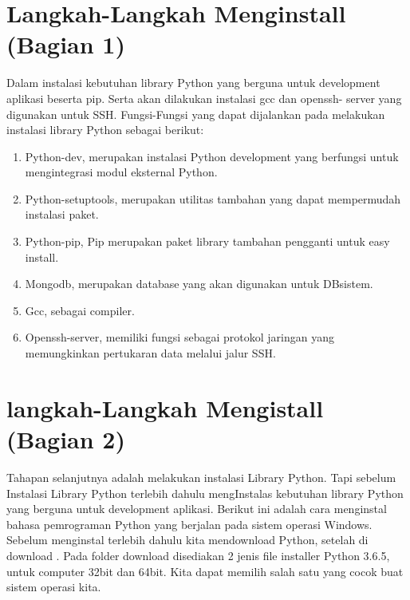 \documentclass[12pt, times new roman, a4paper]{article}
\begin{document}
\section{Langkah-Langkah Menginstall (Bagian 1)}

Dalam instalasi kebutuhan library Python yang berguna untuk development aplikasi beserta pip. Serta akan dilakukan instalasi gcc dan openssh- server yang digunakan untuk SSH.
Fungsi-Fungsi yang dapat dijalankan pada melakukan instalasi library Python sebagai berikut:

\begin{enumerate}
\item Python-dev, merupakan instalasi Python development yang berfungsi untuk mengintegrasi modul eksternal Python.
  \item Python-setuptools, merupakan utilitas tambahan yang dapat mempermudah instalasi paket.
  \item Python-pip, Pip merupakan paket library tambahan pengganti untuk easy install.
  \item Mongodb, merupakan database yang akan digunakan untuk DBsistem.
  \item Gcc, sebagai compiler.
  \item Openssh-server, memiliki fungsi sebagai  protokol jaringan yang memungkinkan pertukaran data melalui jalur SSH.
\end{enumerate}

\section{langkah-Langkah Mengistall (Bagian 2)}

Tahapan selanjutnya adalah melakukan instalasi Library Python. Tapi sebelum Instalasi Library Python terlebih dahulu mengInstalas kebutuhan library Python yang berguna untuk development aplikasi.
Berikut ini adalah cara menginstal bahasa pemrograman Python yang berjalan pada sistem operasi Windows. Sebelum menginstal terlebih dahulu kita mendownload Python, setelah di download  . Pada folder download  disediakan 2 jenis file installer Python 3.6.5, untuk computer 32bit dan 64bit. Kita dapat memilih salah satu yang cocok buat sistem operasi kita.
\end{document}
